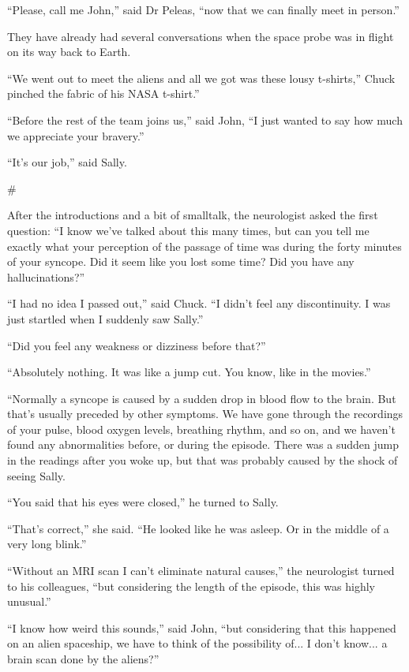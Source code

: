\documentclass[12pt]{book}
\newcommand{\sbreak}{
\begin{center}
  \#
\end{center}
}
\begin{document}
``Please, call me John,'' said Dr Peleas, ``now that we can finally meet in person.''

They have already had several conversations when the space probe was in flight on its way back to Earth. 

``We went out to meet the aliens and all we got was these lousy t-shirts,'' Chuck pinched the fabric of his NASA t-shirt.''

``Before the rest of the team joins us,'' said John, ``I just wanted to say how much we appreciate your bravery.'' 

``It's our job,'' said Sally.

\sbreak

After the introductions and a bit of smalltalk, the neurologist asked the first question:
``I know we've talked about this many times, but can you tell me exactly what your perception of the passage of time was during the forty minutes of your syncope. Did it seem like you lost some time? Did you have any hallucinations?''

``I had no idea I passed out,'' said Chuck. ``I didn't feel any discontinuity. I was just startled when I suddenly saw Sally.'' 

``Did you feel any weakness or dizziness before that?''

``Absolutely nothing. It was like a jump cut. You know, like in the movies.''

``Normally a syncope is caused by a sudden drop in blood flow to the brain. But that's usually preceded by other symptoms. We have gone through the recordings of your pulse, blood oxygen levels, breathing rhythm, and so on, and we haven't found any abnormalities before, or during the episode. There was a sudden jump in the readings after you woke up, but that was probably caused by the shock of seeing Sally.

``You said that his eyes were closed,'' he turned to Sally.

``That's correct,'' she said. ``He looked like he was asleep. Or in the middle of a very long blink.''

``Without an MRI scan I can't eliminate natural causes,'' the neurologist turned to his colleagues, ``but considering the length of the episode, this was highly unusual.''

``I know how weird this sounds,'' said John, ``but considering that this happened on an alien spaceship, we have to think of the possibility of... I don't know... a brain scan done by the aliens?''
\end{document}
